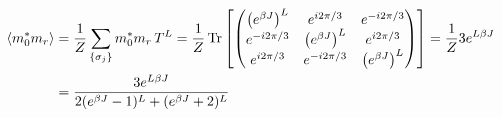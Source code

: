 \documentclass[reprint,english,notitlepage,aps,nobalancelastpage,nofootinbib]{revtex4-1}
\newcommand{\closed}[1]{\left(#1\right)}
\newcommand{\bracket}[1]{\left[#1\right]}
\newcommand{\sumstate}{\sum_{\{\sigma_j\}}}
\newcommand{\ebj}{e^{\beta J}}
\begin{document}
\begin{align*}
	\expval{m_0^* m_r} &= \frac{1}{Z} \sumstate m_0^* m_r \, T^L  
	= \frac{1}{Z} \Tr \bracket{ 
	\begin{pmatrix}
		\closed{\ebj}^L & e^{i2\pi/3} & e^{-i2\pi/3} \\ 
		e^{-i2\pi/3} & \closed{\ebj}^L & e^{i2\pi/3} \\ 
		e^{i2\pi/3} & e^{-i2\pi/3} & \closed{\ebj}^L
	\end{pmatrix}
	}  
	= \frac{1}{Z}3e^{L\beta J} \\ 
	&= \frac{3e^{L\beta J}}{2(\ebj-1)^L+(\ebj+2)^L}
\end{align*}
\end{document}
